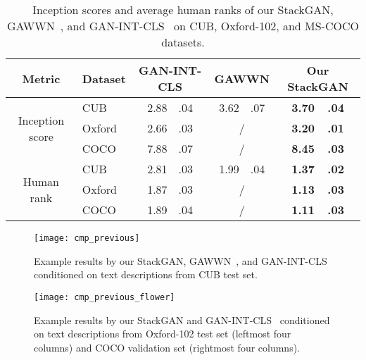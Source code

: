 \documentclass[10pt,twocolumn,letterpaper]{article}
\begin{document}
\begin{table}[bt]
\begin{center}
\scriptsize
\begin{tabular}{|c|l|c|c|c|}
\hline
    Metric &Dataset &GAN-INT-CLS &GAWWN &Our StackGAN\\
\hline
\multirow{3}{3.2em}{Inception score}  &CUB    &2.88~~.04 &3.62~~.07 &{\bf 3.70~~.04}   \\
\cline{2-5}
    &Oxford &2.66~~.03 &/              &{\bf 3.20~~.01}  \\
\cline{2-5}
    &COCO   &7.88~~.07 &/              &{\bf 8.45~~.03}  \\
\hline
\multirow{3}{3.2em}{Human rank}  &CUB    &2.81~~.03 &1.99~~.04  &{\bf 1.37~~.02}  \\
\cline{2-5}
    &Oxford &1.87~~.03 &/               &{\bf 1.13~~.03}   \\
\cline{2-5}
    &COCO   &1.89~~.04 &/               &{\bf 1.11~~.03}  \\
\hline
\end{tabular}
\end{center}
\vspace{-5pt}
    \caption{Inception scores and average human ranks of our StackGAN, GAWWN~\cite{reed2016learning}, and GAN-INT-CLS~\cite{reed2016generative} on CUB, Oxford-102, and MS-COCO datasets.}
\vspace{-15pt}
\label{tab:cmp_previous}
\end{table}


\begin{figure*}[tb]
\begin{center}
\texttt{[image: cmp\_previous]}
\end{center}
\vspace{-8pt}
    \caption{Example results by our StackGAN, GAWWN~\cite{reed2016learning}, and GAN-INT-CLS~\cite{reed2016generative} conditioned on text descriptions from CUB test set.}
\vspace{-2pt}
\label{fig:cmp_previous}
\end{figure*}




\begin{figure*}[tb]
\begin{center}
\texttt{[image: cmp\_previous\_flower]}
\end{center}
\vspace{-8pt}
    \caption{Example results by our StackGAN and GAN-INT-CLS~\cite{reed2016generative} conditioned on text descriptions from Oxford-102 test set (leftmost four columns) and COCO validation set (rightmost four columns).}
 \vspace{-8pt}
\label{fig:cmp_previous_flower}
\end{figure*}
\end{document}
